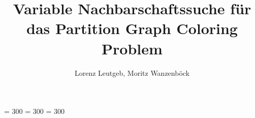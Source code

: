 \usepackage[utf8]{inputenc}
\usepackage[ngerman]{babel}
\usepackage[babel, german=quotes]{csquotes}
\usepackage[style=authoryear, natbib, backend=biber]{biblatex}
\usepackage[top=3cm,bottom=3cm,left=2cm,right=2cm]{geometry}
\usepackage{listings}
\usepackage{graphicx, fancyhdr, array, wrapfig, colortbl, algorithm, algpseudocode, subcaption, setspace}
\usepackage[usenames,dvipsnames]{xcolor}
\renewcommand{\listalgorithmname}{Algorithmenverzeichnis}
\renewcommand{\algorithmicend}{\textbf{Ende}}
\renewcommand{\algorithmicif}{\textbf{Falls}}
\renewcommand{\algorithmicthen}{\textbf{dann}}
\renewcommand{\algorithmicelse}{\textbf{Sonst}}
\renewcommand{\algorithmicdo}{\textbf{}}
\renewcommand{\algorithmicwhile}{\textbf{Solange}}
\renewcommand{\algorithmicreturn}{\textbf{Returniere}}

\linespread{1.5}
\setlength{\parindent}{4mm}
\setlength{\parskip}{2mm}
\pagestyle{fancy}
\fancyhf{}
\clubpenalty = 300
\widowpenalty = 300
\displaywidowpenalty = 300
\fancyfoot{}
\renewcommand{\footrulewidth}{0.4pt}
\rfoot{{\footnotesize \textnormal{\thepage}}}
\lhead{{\footnotesize \textnormal{}}}
\lfoot{{\footnotesize \textnormal{\the\year}}}

\let\origappendix\appendix
\renewcommand\appendix{\clearpage\pagenumbering{roman}\origappendix}

\title{Variable Nachbarschaftssuche für das Partition Graph Coloring Problem}
\author{Lorenz Leutgeb, Moritz Wanzenböck}
